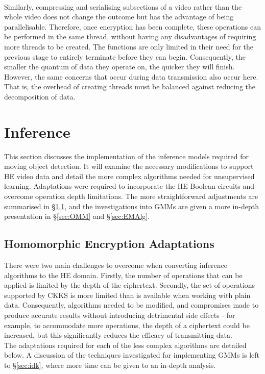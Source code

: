 \smallskip \\ \indent
Similarly, compressing and serialising subsections of a video rather than the whole video does not change the outcome but has the advantage of being parallelisable. Therefore, once encryption has been complete, these operations can be performed in the same thread, without having any disadvantages of requiring more threads to be created. The functions are only limited in their need for the previous stage to entirely terminate before they can begin. Consequently, the smaller the quantum of data they operate on, the quicker they will finish. However, the same concerns that occur during data transmission also occur here. That is, the overhead of creating threads must be balanced against reducing the decomposition of data.

\setlength{\leftskip}{0cm}




\section{Inference}
\label{sec:inference}
\setlength{\leftskip}{0.25cm}
\indent \indent
This section discusses the implementation of the inference models required for moving object detection. It will examine the necessary modifications to support HE video data and detail the more complex algorithms needed for unsupervised learning. Adaptations were required to incorporate the HE Boolean circuits and overcome operation depth limitations. The more straightforward adjustments are summarised in §\ref{sec:adaptations}, and the investigations into GMMs are given a more in-depth presentation in §\ref{sec:OMM} and §\ref{sec:EMAlg}.

\setlength{\leftskip}{0cm}
\subsection{Homomorphic Encryption Adaptations}
\label{sec:adaptations}
\setlength{\leftskip}{0.5cm}
\indent \indent
There were two main challenges to overcome when converting inference algorithms to the HE domain. Firstly, the number of operations that can be applied is limited by the depth of the ciphertext. Secondly, the set of operations supported by CKKS is more limited than is available when working with plain data. Consequently, algorithms needed to be modified, and compromises made to produce accurate results without introducing detrimental side effects - for example, to accommodate more operations, the depth of a ciphertext could be increased, but this significantly reduces the efficacy of transmitting data.
\smallskip \\ \indent
The adaptations required for each of the less complex algorithms are detailed below. A discussion of the techniques investigated for implementing GMMs is left to §\ref{sec:idk}, where more time can be given to an in-depth analysis.


